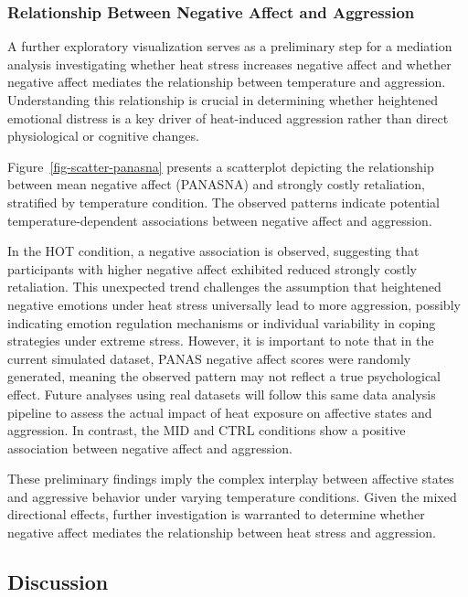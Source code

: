 \documentclass[
  man,
  floatsintext,
  longtable,
  nolmodern,
  notxfonts,
  notimes,
  colorlinks=true,linkcolor=blue,citecolor=blue,urlcolor=blue]{apa7}
\begin{document}
\subsubsection{Relationship Between Negative Affect and
Aggression}\label{relationship-between-negative-affect-and-aggression}

A further exploratory visualization serves as a preliminary step for a
mediation analysis investigating whether heat stress increases negative
affect and whether negative affect mediates the relationship between
temperature and aggression. Understanding this relationship is crucial
in determining whether heightened emotional distress is a key driver of
heat-induced aggression rather than direct physiological or cognitive
changes.

Figure~\ref{fig-scatter-panasna} presents a scatterplot depicting the
relationship between mean negative affect (PANASNA) and strongly costly
retaliation, stratified by temperature condition. The observed patterns
indicate potential temperature-dependent associations between negative
affect and aggression.

In the HOT condition, a negative association is observed, suggesting
that participants with higher negative affect exhibited reduced strongly
costly retaliation. This unexpected trend challenges the assumption that
heightened negative emotions under heat stress universally lead to more
aggression, possibly indicating emotion regulation mechanisms or
individual variability in coping strategies under extreme stress.
However, it is important to note that in the current simulated dataset,
PANAS negative affect scores were randomly generated, meaning the
observed pattern may not reflect a true psychological effect. Future
analyses using real datasets will follow this same data analysis
pipeline to assess the actual impact of heat exposure on affective
states and aggression. In contrast, the MID and CTRL conditions show a
positive association between negative affect and aggression.

These preliminary findings imply the complex interplay between affective
states and aggressive behavior under varying temperature conditions.
Given the mixed directional effects, further investigation is warranted
to determine whether negative affect mediates the relationship between
heat stress and aggression.

\subsection{Discussion}\label{discussion}
\end{document}
